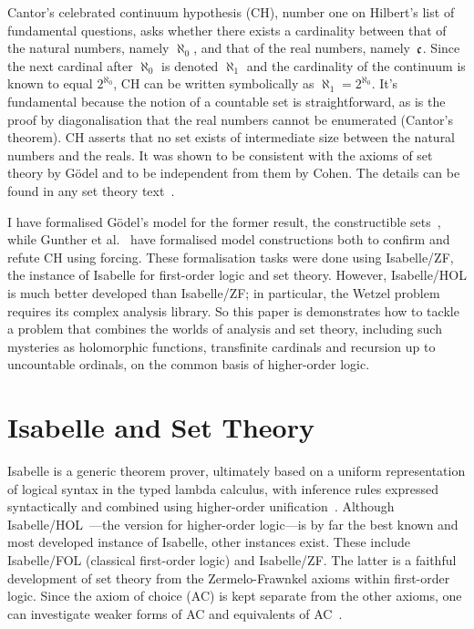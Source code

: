 \documentclass[runningheads]{llncs}
\begin{document}
Cantor's celebrated continuum hypothesis (CH), number one on Hilbert's list of fundamental questions, asks whether there exists a cardinality between that of the natural numbers, namely $\aleph_0$, and that of the real numbers, namely~$\frak{c}$.
Since the next cardinal after $\aleph_0$ is denoted $\aleph_1$ and the cardinality of the continuum is known to equal $2^{\aleph_0}$,  CH can be written symbolically as $\aleph_1 = 2^{\aleph_0}$.
It's fundamental because the notion of a countable set is straightforward, as is the proof by diagonalisation that the real numbers cannot be enumerated (Cantor's theorem).
CH asserts that no set exists of intermediate size between the natural numbers and the reals.
It was shown to be consistent with the axioms of set theory by Gödel and to be independent from them by Cohen.
The details can be found in any set theory text~\cite{kunen80}.

I have formalised Gödel's model for the former result, the constructible sets~\cite{paulson-consistency}, while
Gunther et al.\ \cite{Independence_CH-AFP} have formalised model constructions both to confirm and refute CH using forcing.
These formalisation tasks were done using Isabelle/ZF, the instance of Isabelle for first-order logic and set theory.
However, Isabelle/HOL is much better developed than Isabelle/ZF;
in particular, the Wetzel problem requires its complex analysis library. So this paper is demonstrates how to tackle a problem that combines the worlds of analysis and set theory, including such mysteries as holomorphic functions, transfinite cardinals and recursion up to uncountable ordinals, on the common basis of higher-order logic.


\section{Isabelle and Set Theory}

Isabelle is a generic theorem prover, ultimately based on a uniform representation of logical syntax in the typed lambda calculus, with inference rules expressed syntactically and combined using higher-order unification~\cite{paulson-found}. Although Isabelle/HOL~\cite{isa-tutorial}---the version for higher-order logic---is by far the best known and most developed instance of Isabelle, other instances exist. These include Isabelle/FOL (classical first-order logic) and Isabelle/ZF\@.
The latter is a faithful development of set theory from the Zermelo-Frawnkel axioms within first-order logic.
Since the axiom of choice (AC) is kept separate from the other axioms, one can investigate weaker forms of AC and equivalents of AC~\cite{paulson-gr}. 
\end{document}
